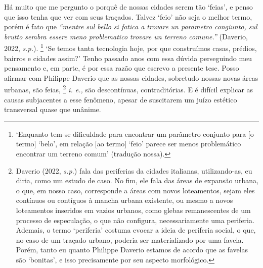 \documentclass[]{report}
\begin{document}
	Há muito que me pergunto o porquê de nossas cidades serem tão `feias', e penso que isso tenha que ver com seus traçados. Talvez `feio' não seja o melhor termo, porém é fato que \textit{“mentre sul bello si fatica a trovare un parametro congiunto, sul brutto sembra essere meno problematico trovare un terreno comune.”} (Daverio, 2022, \textit{s.p.}).
		\footnote[1]{`Enquanto tem-se dificuldade para encontrar um parâmetro conjunto para [o termo] `belo', em relação [ao termo] `feio' parece ser menos problemático encontrar um terreno comum' (tradução nossa).} 
	`Se temos tanta tecnologia hoje, por que construímos casas, prédios, bairros e cidades assim?'  Tenho passado anos com essa dúvida perseguindo meu pensamento e, em parte, é por essa razão que escrevo a presente tese. Posso afirmar com Philippe Daverio que as nossas cidades, sobretudo nossas novas áreas urbanas, são feias,
		\footnote[2]{Daverio (2022, \textit{s.p.}) fala das periferias da cidades italianas, utilizando-as, eu diria, como um estudo de caso. No fim, ele fala das áreas de expansão urbana, o que, em nosso caso, corresponde a áreas com novos loteamentos, sejam eles contínuos ou contíguos à mancha urbana existente, ou mesmo a novos loteamentos inseridos em vazios urbanos, como glebas remanescentes de um processo de especulação, o que não configura, necessariamente uma periferia. Ademais, o termo `periferia' costuma evocar a ideia de periferia social, o que, no caso de um traçado urbano, poderia ser materializado por uma favela. Porém, tanto eu quanto Philippe Daverio estamos de acordo que as favelas são `bonitas', e isso precisamente por seu aspecto morfológico.}
	\textit{i. e.,} são descontínuas, contraditórias. E é difícil explicar as causas subjacentes a esse fenômeno, apesar de suscitarem um juízo estético transversal quase que unânime.
	
\end{document}
